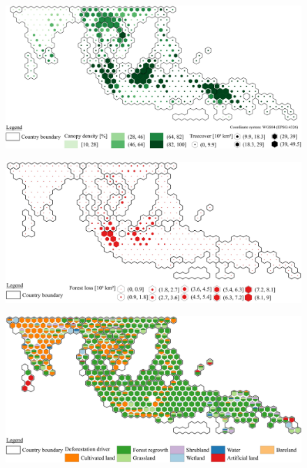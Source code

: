 	\begin{figure}[ht]
		\centering
		\includegraphics[scale=1]{img/asia_treecover_frameless}
		\caption[Ecosystem service values]{}
		\label{fig:asiacover}
	\end{figure}
	\begin{figure}[ht]
		\centering
		\includegraphics[scale=1]{img/asia_loss_frameless}
		\caption[Ecosystem service values]{}
		\label{fig:asialoss}
	\end{figure}
	\begin{figure}[ht]
		\centering
		\includegraphics[scale=1]{img/asia_driver_frameless}
		\caption[Ecosystem service values]{}
		\label{fig:asiadriver}
	\end{figure}
